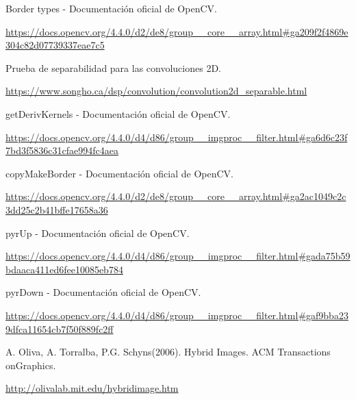\documentclass[12pt, spanish]{article}
\begin{document}
\begin{thebibliography}{9}

	Border types - Documentación oficial de OpenCV.

	\url{https://docs.opencv.org/4.4.0/d2/de8/group__core__array.html#ga209f2f4869e304c82d07739337eae7c5}

	Prueba de separabilidad para las convoluciones 2D.

	\url{https://www.songho.ca/dsp/convolution/convolution2d_separable.html}

	getDerivKernels - Documentación oficial de OpenCV.

	\url{https://docs.opencv.org/4.4.0/d4/d86/group__imgproc__filter.html#ga6d6c23f7bd3f5836c31cfae994fc4aea}


	copyMakeBorder - Documentación oficial de OpenCV.

	\url{https://docs.opencv.org/4.4.0/d2/de8/group__core__array.html#ga2ac1049c2c3dd25c2b41bffe17658a36}

	pyrUp - Documentación oficial de OpenCV.

	\url{https://docs.opencv.org/4.4.0/d4/d86/group__imgproc__filter.html#gada75b59bdaaca411ed6fee10085eb784}

	pyrDown - Documentación oficial de OpenCV.

	\url{https://docs.opencv.org/4.4.0/d4/d86/group__imgproc__filter.html#gaf9bba239dfca11654cb7f50f889fc2ff}


	A. Oliva, A. Torralba, P.G. Schyns(2006). Hybrid Images. ACM Transactions onGraphics.

	\url{http://olivalab.mit.edu/hybridimage.htm}


\end{thebibliography}
\end{document}
